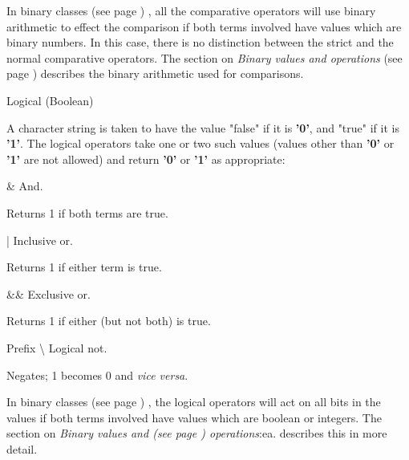 \begin{description}
In  binary classes (see page \pageref{refbincla}) , all the comparative operators
will use binary arithmetic to effect the comparison if both terms
involved have values which are binary numbers.
In this case, there is no distinction between the strict and the normal
comparative operators.
The section on  \emph{Binary values and operations} (see page \pageref{refbinary}) 
describes the binary arithmetic used for comparisons.
\item{Logical (Boolean)}
\index{,}

A character string is taken to have the value "false" if it
is \textbf{'0'}, and "true" if it is \textbf{'1'}.
The logical operators take one or two such values (values other
than \textbf{'0'} or \textbf{'1'} are not allowed) and
return \textbf{'0'} or \textbf{'1'} as appropriate:
\begin{description}
\item{\&}
And.

Returns 1 if both terms are true.
\item{|}
Inclusive or.

Returns 1 if either term is true.
\item{\&\&}
Exclusive or.

Returns 1 if either (but not both) is true.
\item{Prefix \textbackslash }
Logical not.

Negates; 1 becomes 0 and \emph{vice versa}.
\end{description}
 
In  binary classes (see page \pageref{refbincla}) , the logical operators will act on
all bits in the values if both terms involved have values which are
boolean or integers.
The section on  \emph{Binary values and (see page \pageref{refbinary}) 
operations}:ea. describes this in more detail.
\item[Type]\label{reftypeops}


\end{description}
